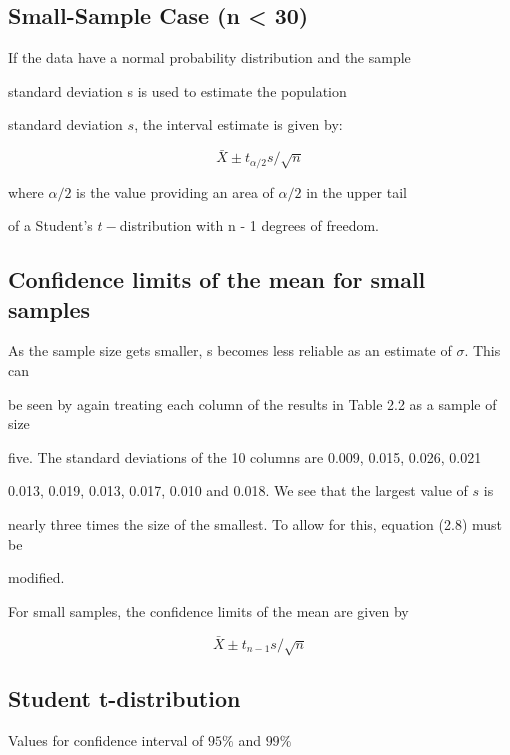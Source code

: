  

\subsection{Small-Sample Case (n < 30)}

If the data have a normal probability distribution and the sample

standard deviation s is used to estimate the population

standard deviation $s$, the interval estimate is given by:

\[ \bar{X} \pm t_{\alpha/2}s /\sqrt{n} \]

where $\alpha/2$ is the value providing an area of $\alpha/2$  in the upper tail

of a Student's $t-$distribution with n - 1 degrees of freedom.

 



\subsection{Confidence limits of the mean for small samples}

 

As the sample size gets smaller, s becomes less reliable as an estimate of $\sigma$. This can

be seen by again treating each column of the results in Table 2.2 as a sample of size

five. The standard deviations of the 10 columns are 0.009, 0.015, 0.026, 0.021

0.013, 0.019, 0.013, 0.017, 0.010 and 0.018. We see that the largest value of $s$ is

nearly three times the size of the smallest. To allow for this, equation (2.8) must be

modified.

 

For small samples, the confidence limits of the mean are given by

\[ \bar{X} \pm t_{n-1}s /\sqrt{n} \]

 



\subsection{Student t-distribution}

 

Values for confidence interval of $95\%$ and $99\%$

